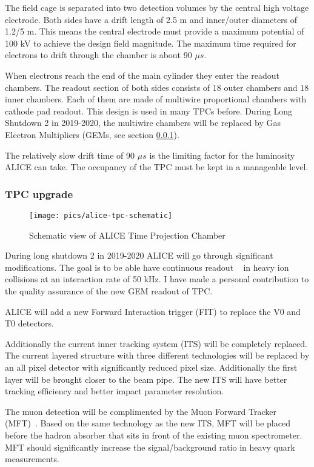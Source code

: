 The field cage is separated into two detection volumes by the central high voltage electrode. Both sides have a drift length of 2.5 m and inner/outer diameters of 1.2/5 m. This means the central electrode must provide a maximum potential of 100 kV to achieve the design field magnitude. The maximum time required for electrons to drift through the chamber is about 90 $\mu s$.

When electrons reach the end of the main cylinder they enter the readout chambers. The readout section of both sides consists of 18 outer chambers and 18 inner chambers. Each of them are made of multiwire proportional chambers with cathode pad readout. This design is used in many TPCs before. During Long Shutdown 2 in 2019-2020, the multiwire chambers will be replaced by Gas Electron Multipliers (GEMs, see section \ref{sec:tpcupgrade}).

The relatively slow drift time of 90 $\mu s$ is the limiting factor for the luminosity ALICE can take. The occupancy of the TPC must be kept in a manageable level. 


\subsubsection{TPC upgrade}
\label{sec:tpcupgrade}
\begin{figure}[htb]
\centering
\texttt{[image: pics/alice-tpc-schematic]}
\caption[TPC]{Schematic view of ALICE Time Projection Chamber}
\label{fig:tpc}
\end{figure}
During long shutdown 2 in 2019-2020 ALICE will go through significant modifications. The goal is to be able have continuous readout ~\cite{aliceupgrade} in heavy ion collisions at an interaction rate of 50 kHz. I have made a personal contribution to the quality assurance of the new GEM readout of TPC.

ALICE will add a new Forward Interaction trigger (FIT) to replace the V0 and T0 detectors. 

Additionally the current inner tracking system (ITS) will be completely replaced. The current layered structure with three different technologies will be replaced by an all pixel detector with significantly reduced pixel size. Additionally the first layer will be brought closer to the beam pipe. The new ITS will have better tracking efficiency and  better impact parameter resolution. 

The muon detection will be complimented by the Muon Forward Tracker (MFT)~\cite{mft}. Based on the same technology as the new ITS, MFT will be placed before the hadron absorber that sits in front of the existing muon spectrometer. MFT should significantly increase the signal/background ratio in heavy quark measurements.

